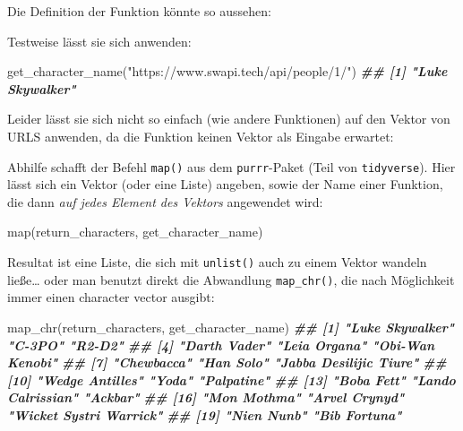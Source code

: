 \documentclass[
  ngerman,
]{article}
\newenvironment{Shaded}{\begin{snugshade}}{\end{snugshade}}
\newcommand{\ControlFlowTok}[1]{\textcolor[rgb]{0.13,0.29,0.53}{\textbf{#1}}}
\newcommand{\DocumentationTok}[1]{\textcolor[rgb]{0.56,0.35,0.01}{\textbf{\textit{#1}}}}
\newcommand{\FunctionTok}[1]{\textcolor[rgb]{0.00,0.00,0.00}{#1}}
\newcommand{\NormalTok}[1]{#1}
\newcommand{\OtherTok}[1]{\textcolor[rgb]{0.56,0.35,0.01}{#1}}
\newcommand{\SpecialCharTok}[1]{\textcolor[rgb]{0.00,0.00,0.00}{#1}}
\newcommand{\StringTok}[1]{\textcolor[rgb]{0.31,0.60,0.02}{#1}}
\begin{document}
Die Definition der Funktion könnte so aussehen:

\begin{Shaded}
\end{Shaded}

Testweise lässt sie sich anwenden:

\begin{Shaded}
\begin{Highlighting}[]
\FunctionTok{get\_character\_name}\NormalTok{(}\StringTok{"https://www.swapi.tech/api/people/1/"}\NormalTok{)}
\DocumentationTok{\#\# [1] "Luke Skywalker"}
\end{Highlighting}
\end{Shaded}

Leider lässt sie sich nicht so einfach (wie andere Funktionen) auf den Vektor von URLS anwenden, da die Funktion keinen Vektor als Eingabe erwartet:

Abhilfe schafft der Befehl \texttt{map()} aus dem \texttt{purrr}-Paket (Teil von \texttt{tidyverse}). Hier lässt sich ein Vektor (oder eine Liste) angeben, sowie der Name einer Funktion, die dann \emph{auf jedes Element des Vektors} angewendet wird:

\begin{Shaded}
\begin{Highlighting}[]
\FunctionTok{map}\NormalTok{(return\_characters, get\_character\_name)}
\end{Highlighting}
\end{Shaded}

Resultat ist eine Liste, die sich mit \texttt{unlist()} auch zu einem Vektor wandeln ließe\ldots{} oder man benutzt direkt die Abwandlung \texttt{map\_chr()}, die nach Möglichkeit immer einen character vector ausgibt:

\begin{Shaded}
\begin{Highlighting}[]
\FunctionTok{map\_chr}\NormalTok{(return\_characters, get\_character\_name)}
\DocumentationTok{\#\#  [1] "Luke Skywalker"        "C{-}3PO"                 "R2{-}D2"                }
\DocumentationTok{\#\#  [4] "Darth Vader"           "Leia Organa"           "Obi{-}Wan Kenobi"       }
\DocumentationTok{\#\#  [7] "Chewbacca"             "Han Solo"              "Jabba Desilijic Tiure"}
\DocumentationTok{\#\# [10] "Wedge Antilles"        "Yoda"                  "Palpatine"            }
\DocumentationTok{\#\# [13] "Boba Fett"             "Lando Calrissian"      "Ackbar"               }
\DocumentationTok{\#\# [16] "Mon Mothma"            "Arvel Crynyd"          "Wicket Systri Warrick"}
\DocumentationTok{\#\# [19] "Nien Nunb"             "Bib Fortuna"}
\end{Highlighting}
\end{Shaded}
\end{document}
